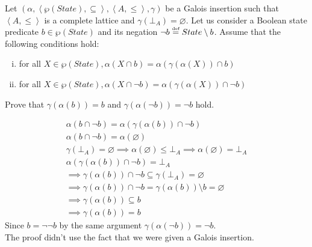 \begin{exercise}{
    Let $(\alpha, \left<\wp(State), \subseteq\right>, \left<A, \leq\right>, \gamma)$ be a Galois insertion such that $\left<A, \leq\right>$ is a complete lattice and $\gamma(\bot_A) = \varnothing$. Let us consider a Boolean state predicate $b \in \wp(State)$ and its negation $\neg b \overset{\text{\tiny def}}{=} State \setminus b$. Assume that the following conditions hold:
    \begin{enumerate}[(i)]
        \item for all $X \in \wp(State), \alpha(X \cap b) = \alpha(\gamma(\alpha(X)) \cap b)$
        \item for all $X \in \wp(State), \alpha(X \cap \neg b) = \alpha(\gamma(\alpha(X)) \cap \neg b)$
    \end{enumerate}
    Prove that $\gamma(\alpha(b)) = b$ and $\gamma(\alpha(\neg b)) = \neg b$ hold.
}
    \begin{gather*}
        \alpha(b \cap \neg b) = \alpha(\gamma(\alpha(b)) \cap \neg b) \\
        \alpha(b \cap \neg b) = \alpha(\varnothing) \\
        \gamma(\bot_A) = \varnothing \implies \alpha(\varnothing) \leq \bot_A \implies \alpha(\varnothing) = \bot_A \\
        \alpha(\gamma(\alpha(b)) \cap \neg b) = \bot_A \\
        \implies \gamma(\alpha(b)) \cap \neg b \subseteq \gamma(\bot_A) = \varnothing \\
        \implies \gamma(\alpha(b)) \cap \neg b = \gamma(\alpha(b)) \setminus b = \varnothing \\
        \implies \gamma(\alpha(b)) \subseteq b \\
        \implies \gamma(\alpha(b)) = b
    \end{gather*}
    Since $b = \neg \neg b$ by the same argument $\gamma(\alpha(\neg b)) = \neg b$. \\
    The proof didn't use the fact that we were given a Galois insertion.
\end{exercise}
